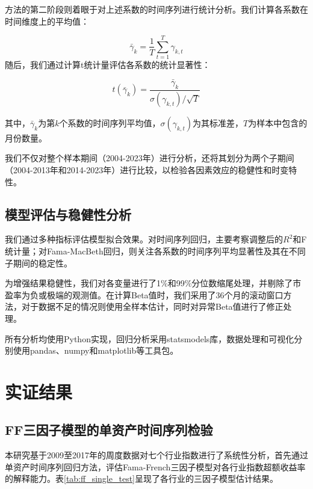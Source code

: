 \documentclass[12pt, a4paper]{article}
\begin{document}
方法的第二阶段则着眼于对上述系数的时间序列进行统计分析。我们计算各系数在时间维度上的平均值：

\begin{equation}
\bar{\gamma}_k = \frac{1}{T}\sum_{t=1}^{T}\gamma_{k,t}
\end{equation}
随后，我们通过计算t统计量评估各系数的统计显著性：

\begin{equation}
t(\bar{\gamma}_k) = \frac{\bar{\gamma}_k}{\sigma(\gamma_{k,t})/\sqrt{T}}
\end{equation}

其中，$\bar{\gamma}_k$为第$k$个系数的时间序列平均值，$\sigma(\gamma_{k,t})$为其标准差，$T$为样本中包含的月份数量。

我们不仅对整个样本期间（2004-2023年）进行分析，还将其划分为两个子期间（2004-2013年和2014-2023年）进行比较，以检验各因素效应的稳健性和时变特性。

\subsection{模型评估与稳健性分析}

我们通过多种指标评估模型拟合效果。对时间序列回归，主要考察调整后的$R^2$和F统计量；对Fama-MacBeth回归，则关注各系数的时间序列平均显著性及其在不同子期间的稳定性。

为增强结果稳健性，我们对各变量进行了1\%和99\%分位数缩尾处理，并剔除了市盈率为负或极端的观测值。在计算Beta值时，我们采用了36个月的滚动窗口方法，对于数据不足的情况则使用全样本估计，同时对异常Beta值进行了修正处理。

所有分析均使用Python实现，回归分析采用statsmodels库，数据处理和可视化分别使用pandas、numpy和matplotlib等工具包。

\section{实证结果}

\subsection{FF三因子模型的单资产时间序列检验}

本研究基于2009至2017年的周度数据对七个行业指数进行了系统性分析，首先通过单资产时间序列回归方法，评估Fama-French三因子模型对各行业指数超额收益率的解释能力。表\ref{tab:ff_single_test}呈现了各行业的三因子模型估计结果。
\end{document}

